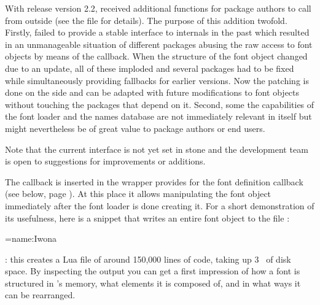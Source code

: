 With release version 2.2,  received
additional functions for package authors to call from outside
(see the file  for details).
%
The purpose of this addition twofold.
%
Firstly,  failed to provide a stable interface
to internals in the past which resulted in an unmanageable situation
of different packages abusing the raw access to font objects by means
of the  callback.
%
When the structure of the font object changed due to an update, all
of these imploded and several packages had to be fixed while
simultaneously providing fallbacks for earlier versions.
%
Now the patching is done on the  side and can
be adapted with future modifications to font objects without touching
the packages that depend on it.
%
Second, some the capabilities of the font loader and the names
database are not immediately relevant in 
itself but might nevertheless be of great value to package authors or
end users.

Note that the current interface is not yet set in stone and the
development team is open to suggestions for improvements or
additions.


The  callback is inserted in the wrapper
 provides for the font definition callback
(see below, page \pageref{define-font}).
%
At this place it allows manipulating the font object immediately after
the font loader is done creating it.
%
For a short demonstration of its usefulness, here is a snippet that
writes an entire font object to the file :

\beginlisting
  
  \font\dumpme=name:Iwona
  \bye
\endlisting

: this creates a Lua file of around 150,000 lines of
code, taking up 3~ of disk space.
%
By inspecting the output you can get a first impression of how a font
is structured in \LUATEX’s memory, what elements it is composed of,
and in what ways it can be rearranged.

